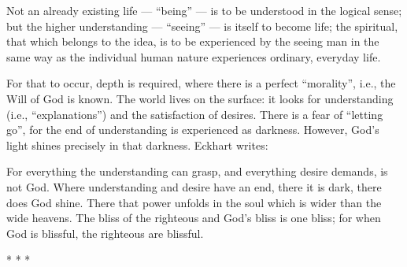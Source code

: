 \begin{quotex}
Not an already existing life — “being” — is to be understood in the logical sense; but the higher understanding — “seeing” — is itself to become life; the spiritual, that which belongs to the idea, is to be experienced by the seeing man in the same way as the individual human nature experiences ordinary, everyday life. 

\end{quotex}
For that to occur, depth is required, where there is a perfect “morality”, i.e., the Will of God is known. The world lives on the surface: it looks for understanding (i.e., “explanations”) and the satisfaction of desires. There is a fear of “letting go”, for the end of understanding is experienced as darkness. However, God's light shines precisely in that darkness. Eckhart writes:

\begin{quotex}
For everything the understanding can grasp, and everything desire demands, is not God. Where understanding and desire have an end, there it is dark, there does God shine. There that power unfolds in the soul which is wider than the wide heavens. The bliss of the righteous and God's bliss is one bliss; for when God is blissful, the righteous are blissful. 

\end{quotex}



\begin{center}* * *\end{center}

